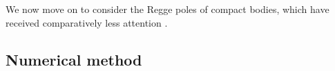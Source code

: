 \documentclass[aps,prd,longbibliography,reprint,twocolumn,amsmath,amssymb,amsfonts,showpacs,footnote,superscriptaddress]{revtex4-1}%
\begin{document}
We now move on to consider the Regge poles of compact bodies, which have received comparatively less attention \cite{ChandrasekharIV:1992ey}.



 \subsection{Numerical method}\label{subsec:method}


\end{document}
